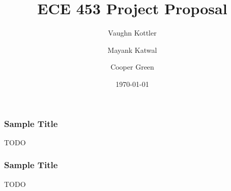 \documentclass{beamer}
\title{ECE 453 Project Proposal}
\author{Vaughn Kottler}
\author{Mayank Katwal}
\author{Cooper Green}
\date{\today}
\begin{document}
\frame{\titlepage}

\begin{frame}
\frametitle{Sample Title}
TODO
\end{frame}

\begin{frame}
\frametitle{Sample Title}
TODO
\end{frame}
\end{document}
